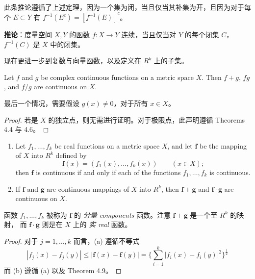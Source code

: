 \documentclass[../poma-notes.tex]{subfiles}
\begin{document}
此条推论遵循了上述定理，因为一个集为闭，当且仅当其补集为开，且因为对于每个 $E \subset Y$ 有 $f^{-1}(E^c) = [f^{-1}(E)]^c$。

\begin{anote}
  \textbf{推论}：度量空间 $X, Y$ 的函数 $f: X \to Y$ 连续，当且仅当对 $Y$ 的每个闭集 $C$，$f^{-1}(C)$ 是 $X$ 中的闭集。
\end{anote}

现在更进一步到复数与向量函数，以及定义在 $R^k$ 上的子集。

\begin{theorem}
  Let $f$ and $g$ be complex continuous functions on a metric space $X$. Then $f + g$, $fg$, and $f/g$ are
  continuous on $X$.
\end{theorem}

最后一个情况，需要假设 $g(x) \ne 0$，对于所有 $x \in X$。

\begin{proof}
  若是 $X$ 的独立点，则无需进行证明。对于极限点，此声明遵循 Theorems 4.4 与 4.6。
\end{proof}

\begin{theorem}\mbox{}\par
  \begin{enumerate}[label=(\alph*)]
    \item Let $f_1, \dots, f_k$ be real functions on a metric space $X$, and let $\pmb{f}$ be the mapping of
          $X$ into $R^k$ defined by
          \begin{equation}
            \mathbf{f}(x) = (f_1(x),\dots,f_k(x)) \qquad (x \in X);
          \end{equation}
          then $\mathbf{f}$ is continuous if and only if each of the functions $f_1,\dots,f_k$ is continuous.
    \item If $\mathbf{f}$ and $\mathbf{g}$ are continuous mappings of $X$ into $R^k$, then $\mathbf{f + g}$
          and $\mathbf{f \cdot g}$ are continuous on $X$.
  \end{enumerate}
\end{theorem}

函数 $f_1,\dots,f_k$ 被称为 $\mathbf{f}$ 的 \textit{分量 components} 函数。注意 $\mathbf{f + g}$ 是一个至 $R^k$ 的映射，
而 $\mathbf{f \cdot g}$ 则是在 $X$ 上的 \textit{实 real} 函数。

\begin{proof}
  对于 $j = 1,\dots,k$ 而言，(a) 遵循不等式
  \[
    |f_j(x) - f_j(y)| \le |\mathbf{f}(x) - \mathbf{f}(y)| =
    \biggl\{ \sum_{i=1}^k |f_i(x) - f_i(y)|^2 \biggr\}^{\frac{1}{2}}
  \]
  而 (b) 遵循 (a) 以及 Theorem 4.9。
\end{proof}
\end{document}
